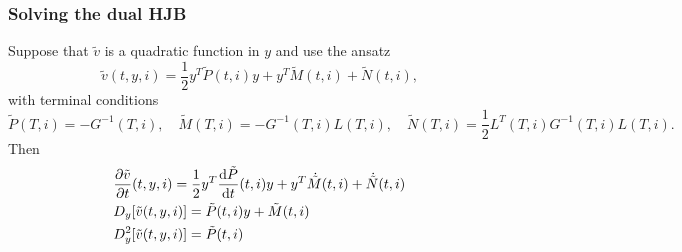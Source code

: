 \subsubsection{Solving the dual HJB}
Suppose that $\tilde{v}$ is a quadratic function in $y$ and use the ansatz
\begin{equation}
    \tilde{v}(t,y, i) = \frac12 y^T \tilde{P}(t,i) y + y^T \tilde{M}(t,i) + \tilde{N}(t,i),
\end{equation}
with terminal conditions
\begin{equation}
    \tilde{P}(T,i) = -G^{-1}(T,i), \quad \tilde{M}(T,i) = - G^{-1}(T,i)L(T,i), \quad \tilde{N}(T,i) = \frac12 L^T(T,i)G^{-1}(T,i)L(T,i). 
\end{equation}
Then
\begin{align*}
    &\frac{\partial \tilde{v}}{\partial t}(t, y,i) = \frac12 y^T \frac{\mathrm{d} \tilde{P}}{\mathrm{d} t}(t,i) y + y^T \dot{\tilde{M}}(t,i) + \dot{\tilde{N}}(t,i)\\
    &D_y[\tilde{v}(t,y,i)] = \tilde{P}(t,i) y + \tilde{M}(t,i)\\
    &D_y^2[\tilde{v}(t,y,i)] = \tilde{P}(t,i)
\end{align*}

